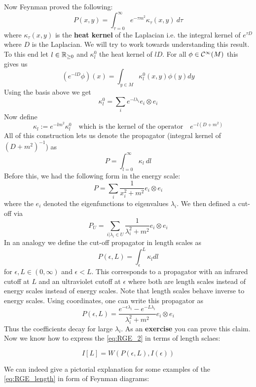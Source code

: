 Now Feynman proved the following:
$$ P(x,y) = \int_{\tau = 0}^{\infty} e^{- \tau m^2} \kappa_\tau (x,y) \ d\tau $$
where $\kappa_\tau (x,y)$ is the \textbf{heat kernel} of the Laplacian i.e. the integral kernel of $e^{\tau D}$ where $D$ is the Laplacian. We will try to work towards understanding this result.\\

To this end let $l \in \mathbb{R}_{\geq 0}$ and $\kappa^0_l$ the heat kernel of $lD$. For all $\phi \in \Ci(M)$ this gives us
$$ \left( e^{-lD}\phi \right) (x) = \int_{y \in M} \kappa^0_l (x,y) \phi(y) dy $$
Using the basis above we get
$$ \kappa^0_l = \sum_i e^{-l \lambda_i} e_i \otimes e_i $$
Now define
$$ \kappa_l := e^{-l m^2} \kappa^0_l \quad \text{which is the kernel of the operator} \quad e^{-l (D+m^2)} $$
All of this construction lets us denote the propagator (integral kernel of $(D+m^2)^{-1}$) as
$$ P = \int_{l=0}^\infty \kappa_l \ dl $$
Before this, we had the following form in the energy scale:
$$ P = \sum_i \frac{1}{x_i^2 + m^2} e_i \otimes e_i $$
where the $e_i$ denoted the eigenfunctions to eigenvalues $\lambda_i$. We then defined a cut-off via
$$ P_U = \sum_{i|\lambda_i \in U} \frac{1}{\lambda_i^2 + m^2} e_i \otimes e_i$$
In an analogy we define the cut-off propagator in length scales as
$$ P(\epsilon, L) = \int_\epsilon^L \kappa_l dl $$
for $\epsilon, L \in (0,\infty)$ and $\epsilon < L$. This corresponds to a propagator with an infrared cutoff at $L$ and an ultraviolet cutoff at $\epsilon$ where both are length scales instead of energy scales instead of energy scales. Note that length scales behave inverse to energy scales. Using coordinates, one can write this propagator as
$$ P(\epsilon, L) = \frac{e^{-\epsilon \lambda_i} - e^{-L  \lambda_i}}{\lambda_i^2 + m^2} e_i \otimes e_i $$
Thus the coefficients decay for large $\lambda_i$. As an \textbf{exercise} you can prove this claim.\\

Now we know how to express the \eqref{eq:RGE_2} in terms of length sclaes:

\begin{equation}
\label{eq:RGE_length}\tag{L-RGE}
  I[L] = W(P(\epsilon, L), I(\epsilon))
\end{equation}

We can indeed give a pictorial explanation for some examples of the \eqref{eq:RGE_length} in form of Feynman diagrams:

